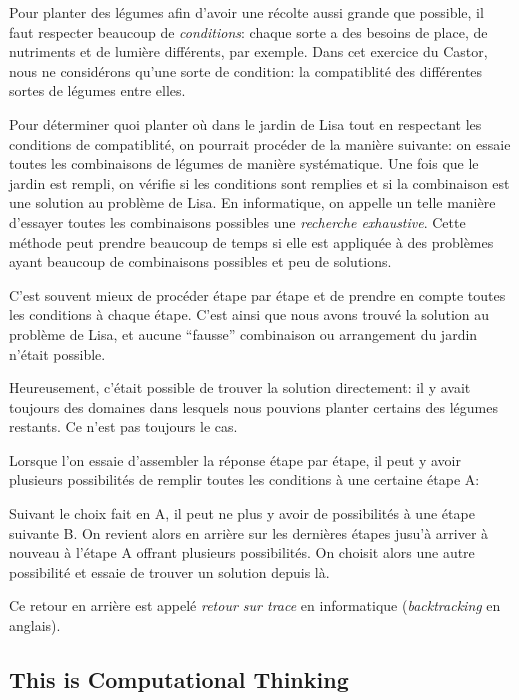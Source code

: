 \documentclass[a4paper,11pt]{report}
\newcommand{\taskGraphicsFolder}{..}
\begin{document}
Pour planter des légumes afin d’avoir une récolte aussi grande que possible, il faut respecter beaucoup de \emph{conditions}: chaque sorte a des besoins de place, de nutriments et de lumière différents, par exemple. Dans cet exercice du Castor, nous ne considérons qu’une sorte de condition: la compatiblité des différentes sortes de légumes entre elles.

Pour déterminer quoi planter où dans le jardin de Lisa tout en respectant les conditions de compatiblité, on pourrait procéder de la manière suivante: on essaie toutes les combinaisons de légumes de manière systématique. Une fois que le jardin est rempli, on vérifie si les conditions sont remplies et si la combinaison est une solution au problème de Lisa. En informatique, on appelle un telle manière d’essayer toutes les combinaisons possibles une \emph{recherche exhaustive}. Cette méthode peut prendre beaucoup de temps si elle est appliquée à des problèmes ayant beaucoup de combinaisons possibles et peu de solutions.

C’est souvent mieux de procéder étape par étape et de prendre en compte toutes les conditions à chaque étape. C’est ainsi que nous avons trouvé la solution au problème de Lisa, et aucune “fausse” combinaison ou arrangement du jardin n’était possible.

Heureusement, c’était possible de trouver la solution directement: il y avait toujours des domaines dans lesquels nous pouvions planter certains des légumes restants. Ce n’est pas toujours le cas.

Lorsque l’on essaie d’assembler la réponse étape par étape, il peut y avoir plusieurs possibilités de remplir toutes les conditions à une certaine étape A:

{\centering%
\par}

Suivant le choix fait en A, il peut ne plus y avoir de possibilités à une étape suivante B. On revient alors en arrière sur les dernières étapes jusu’à arriver à nouveau à l’étape A offrant plusieurs possibilités. On choisit alors une autre possibilité et essaie de trouver un solution depuis là.

Ce retour en arrière est appelé \emph{retour sur trace} en informatique (\emph{backtracking} en anglais).


\subsection*{This is Computational Thinking}
\end{document}
